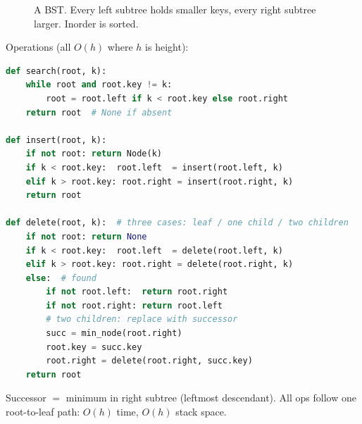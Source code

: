 \begin{figure}[h]
\centering
{}
\caption{A BST. Every left subtree holds smaller keys, every right subtree larger. Inorder is sorted.}
\label{fig:bst-example}
\end{figure}

Operations (all $O(h)$ where $h$ is height):

\begin{lstlisting}[language=Python]
def search(root, k):
    while root and root.key != k:
        root = root.left if k < root.key else root.right
    return root  # None if absent

def insert(root, k):
    if not root: return Node(k)
    if k < root.key:  root.left  = insert(root.left, k)
    elif k > root.key: root.right = insert(root.right, k)
    return root

def delete(root, k):  # three cases: leaf / one child / two children
    if not root: return None
    if k < root.key:  root.left  = delete(root.left, k)
    elif k > root.key: root.right = delete(root.right, k)
    else:  # found
        if not root.left:  return root.right
        if not root.right: return root.left
        # two children: replace with successor
        succ = min_node(root.right)
        root.key = succ.key
        root.right = delete(root.right, succ.key)
    return root
\end{lstlisting}

Successor $=$ minimum in right subtree (leftmost descendant). All ops follow one root-to-leaf path: $O(h)$ time, $O(h)$ stack space.

